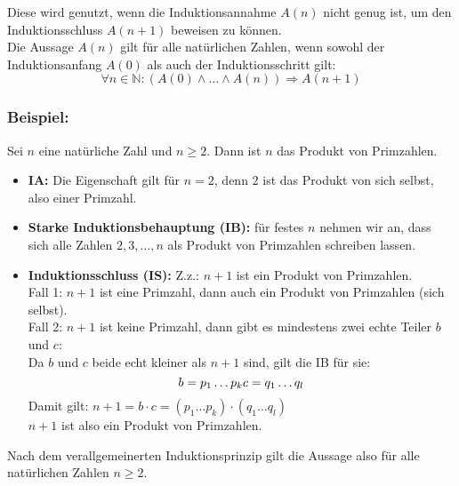 \begin{framed} 
  Diese wird genutzt, wenn die Induktionsannahme $A(n)$ nicht genug ist, um den
  Induktionsschluss $A(n+1)$ beweisen zu können.\\
  Die Aussage $A(n)$ gilt für alle natürlichen Zahlen, wenn sowohl der
  Induktionsanfang $A(0)$ als auch der Induktionsschritt gilt:
  \begin{equation*}
    \forall n \in \mathbb{N} : (A(0) \wedge \dots \wedge A(n)) \Rightarrow A(n+1)
  \end{equation*}

  \subsubsection*{Beispiel:} Sei $n$ eine natürliche Zahl und $n \geq 2$. Dann 
  ist $n$ das Produkt von Primzahlen. \\
  \begin{itemize}
    \setlength{\itemsep}{-0.1cm}
    \item \textbf{IA:} Die Eigenschaft gilt für $n = 2$, denn $2$ ist das 
          Produkt von sich selbst, also einer Primzahl.
    \item \textbf{Starke Induktionsbehauptung (IB):} für festes $n$ nehmen wir 
          an, dass sich alle Zahlen $2,3,\dots, n$ als Produkt von Primzahlen
          schreiben lassen.
    \item \textbf{Induktionsschluss (IS):} Z.z.: $n + 1$ ist ein Produkt von 
          Primzahlen.\\
          Fall 1: $n + 1$ ist eine Primzahl, dann auch ein Produkt von Primzahlen
          (sich selbst).\\
          Fall 2: $n + 1$ ist keine Primzahl, dann gibt es mindestens zwei echte
          Teiler $b$ und $c$:\\
          Da $b$ und $c$ beide echt kleiner als $n + 1$ sind, gilt die IB für sie:
          \begin{equation*}
            b = p_1\dots p_k \space\space c = q_1\dots q_l
          \end{equation*}
          Damit gilt: $n + 1 = b \cdot c = (p_1\dots p_k)\cdot(q_1\dots q_l)$\\
          $n + 1$ ist also ein Produkt von Primzahlen.
  \end{itemize}
  Nach dem verallgemeinerten Induktionsprinzip gilt die Aussage also für alle 
  natürlichen Zahlen $n \geq 2$.
\end{framed}

